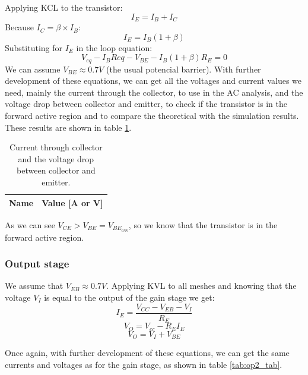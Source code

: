 Applying KCL to the transistor:
\begin{equation}
    I_{E}=I_{B}+I_{C}
\end{equation}
Because $I_{C}=\beta \times I_{B}$:
\begin{equation}
    I_{E}=I_{B}\left( 1+\beta \right)
\end{equation}
Substituting for $I_{E}$ in the loop equation:
\begin{equation}
    V_{eq}-I_{B}Req-V_{BE}-I_{B}\left( 1+\beta \right) R_{E}=0
\end{equation}
We can assume $V_{BE}\approx 0.7V$ (the usual potencial barrier).
With further development of these equations, we can get all the voltages and current values we need, mainly the current through the collector, 
to use in the AC analysis, and the voltage drop between collector and emitter, to check if the transistor is in the forward active region and to compare the 
theoretical with the simulation results. 
These results are shown in table \ref{tab:op1_tab}.

\begin{table}[h]
    \centering
    \begin{tabular}{|l|r|}
      \hline
      {\bf Name} & {\bf Value [A or V]} \\ \hline
      
    \end{tabular}
    \caption{Current through collector and the voltage drop between collector and emitter.}
    \label{tab:op1_tab}
  \end{table}


As we can see $V_{CE} > V_{BE}=V_{BE_{ON}}$, so we know that the transistor is in the forward active region.

\subsubsection{Output stage}
We assume that $V_{EB}\approx 0.7V$.
Applying KVL to all meshes and knowing that the voltage $V_{I}$ is equal to the output of the gain stage we get:
\begin{equation}
    I_{E}=\frac{V_{CC}-V_{EB}-V_{I}}{R_{E}}
\end{equation}
\begin{equation}
    V_{O}=V_{cc}-R_{E}I_{E}
\end{equation}
\begin{equation}
    V_{O}=V_{I}+V_{BE}
\end{equation}

Once again, with further development of these equations, we can get the same currents and voltages as for the gain stage, as shown in table \ref{tab:op2_tab}.

